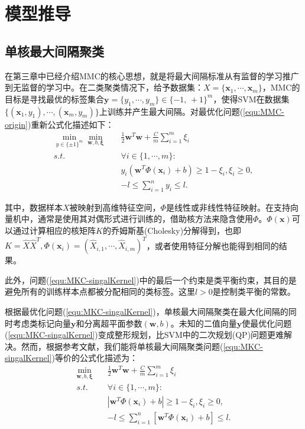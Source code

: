 \section{模型推导}
\subsection{单核最大间隔聚类}
在第三章中已经介绍MMC的核心思想，就是将最大间隔标准从有监督的学习推广到无监督的学习中。在二类聚类情况下，给予数据集：$X=\{\mathbf{x}_1,\cdots,\mathbf{x}_m\}$，MMC的目标是寻找最优的标签集合$\mathbf{y}=\{y_1,\cdots,y_m\}\in\{-1,\,+1\}^m$，使得SVM在数据集$\{(\mathbf{x}_1,y_1),\cdots,(\mathbf{x}_m,y_m)\}$上训练并产生最大间隔。对最优化问题(\ref{equ:MMC-origin})重新公式化描述如下：
\begin{equation}
\begin{split}
\min_{y\in\{\pm1\}^m}\min_{\mathbf{w},b,\mathbf{\xi}} \quad & \frac{1}{2}\mathbf{w}^T\mathbf{w}+\frac{C}{m}\sum^m_{i=1}\xi_i \\
s.t. \quad & \forall i\in\{1,\cdots,m\}: \\
& y_i(\mathbf{w}^T\Phi(\mathbf{x}_i)+b) \ge 1-\xi_i,\xi_i \ge 0,  \\
& -l \le \sum^n_{i=1}y_i \le l.
\label{equ:MKC-singalKernel}
\end{split}
\end{equation}

其中，数据样本$X$被映射到高维特征空间，$\Phi$是线性或非线性特征映射。在支持向量机中，通常是使用其对偶形式进行训练的，借助核方法来隐含使用$\Phi$。$\Phi(\mathbf{x})$可以通过计算相应的核矩阵$K$的乔姆斯基(Cholesky)分解得到，也即$K=\hat{X}\hat{X}^T,\Phi(\mathbf{x}_i)=(\hat{X}_{i,1},\cdots,\hat{X}_{i,m})^T$，或者使用特征分解也能得到相同的结果。

此外，问题(\ref{equ:MKC-singalKernel})中的最后一个约束是类平衡约束，其目的是避免所有的训练样本点都被分配相同的类标签。这里$l > 0$是控制类平衡的常数。

根据最优化问题(\ref{equ:MKC-singalKernel})，单核最大间隔聚类在最大化间隔的同时考虑类标记向量$\mathbf{y}$和分离超平面参数$(\mathbf{w},b)$。未知的二值向量$\mathbf{y}$使最优化问题(\ref{equ:MKC-singalKernel})变成整形规划，比SVM中的二次规划(QP)问题更难解决。然而，根据参考文献\cite{zhao2008efficient}，我们能将单核最大间隔聚类问题(\ref{equ:MKC-singalKernel})等价的公式化描述为：
\begin{equation}
\begin{split}
\min_{\mathbf{w},b,\mathbf{\xi}}  \quad  & \frac{1}{2}\mathbf{w}^T\mathbf{w}+\frac{C}{m}\sum^m_{i=1}\xi_i \\
s.t. \quad & \forall i\in\{1,\cdots,m\}:  \\
& \left |\mathbf{w}^T\Phi(\mathbf{x}_i)+b \right | \ge 1-\xi_i,\xi_i \ge 0,  \\
& -l \le \sum^n_{i=1} \left [\mathbf{w}^T\Phi(\mathbf{x}_i)+b \right ] \le l.  
\label{equ:MKC-singalKernelRelax}
\end{split}
\end{equation}

